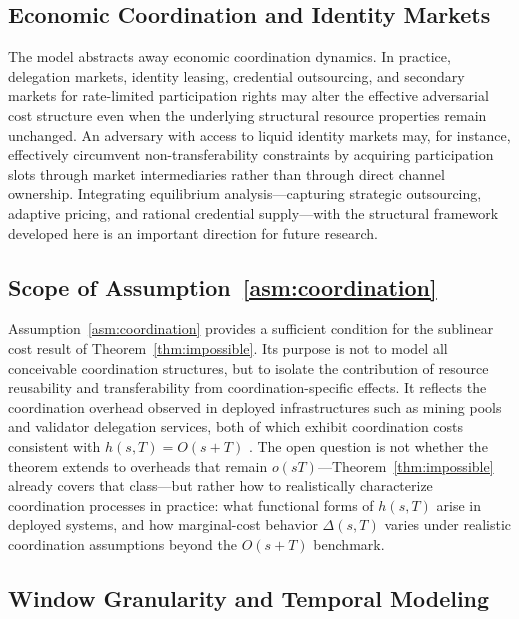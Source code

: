\documentclass[manuscript,review]{acmart}
\theoremstyle{remark}
\begin{document}
	\subsection{Economic Coordination and Identity Markets}
	\label{ssec:lim_markets}
	
	The model abstracts away economic coordination
	dynamics.
	In practice, delegation markets, identity leasing,
	credential outsourcing, and secondary markets for
	rate-limited participation rights may alter the
	effective adversarial cost structure even when the
	underlying structural resource properties remain
	unchanged.
	An adversary with access to liquid identity markets
	may, for instance, effectively circumvent
	non-transferability constraints by acquiring
	participation slots through market intermediaries
	rather than through direct channel ownership.
	Integrating equilibrium analysis---capturing
	strategic outsourcing, adaptive pricing, and
	rational credential supply---with the structural
	framework developed here is an important direction
	for future research.
	
	\subsection{Scope of Assumption~\ref{asm:coordination}}
	\label{ssec:lim_assumption}
	
	Assumption~\ref{asm:coordination} provides a
	sufficient condition for the sublinear cost result of
	Theorem~\ref{thm:impossible}.
	Its purpose is not to model all conceivable
	coordination structures, but to isolate the
	contribution of resource reusability and
	transferability from coordination-specific effects.
	It reflects the coordination overhead observed in
	deployed infrastructures such as mining pools and
	validator delegation services, both of which exhibit
	coordination costs consistent with
	$h(s,T)=O(s+T)$
	\cite{rosenfeld2011analysis,saleh2021blockchain}.
	The open question is not whether the theorem extends
	to overheads that remain $o(sT)$---Theorem~\ref{thm:impossible}
	already covers that class---but rather how to
	realistically characterize coordination processes in
	practice: what functional forms of $h(s,T)$ arise in
	deployed systems, and how marginal-cost behavior
	$\Delta(s,T)$ varies under realistic coordination
	assumptions beyond the $O(s+T)$ benchmark.
	
	\subsection{Window Granularity and Temporal Modeling}
	\label{ssec:lim_windows}
	
\end{document}
